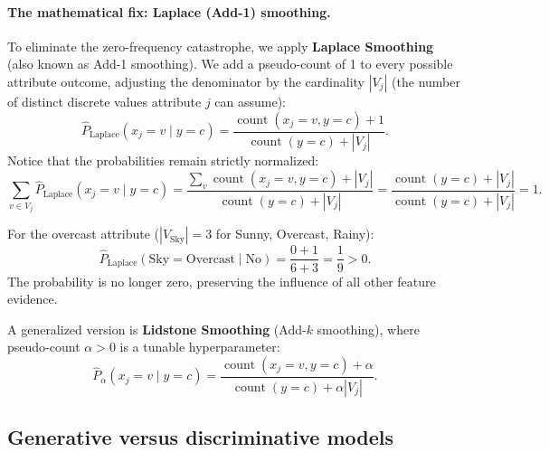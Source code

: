 \paragraph{The mathematical fix: Laplace (Add-1) smoothing.}
To eliminate the zero-frequency catastrophe, we apply \textbf{Laplace Smoothing} (also known as Add-1 smoothing). We add a pseudo-count of 1 to every possible attribute outcome, adjusting the denominator by the cardinality $|V_j|$ (the number of distinct discrete values attribute $j$ can assume):
\begin{equation}
\hat{P}_{\text{Laplace}}(x_j = v \mid y = c) = \frac{\operatorname{count}(x_j = v, y = c) + 1}{\operatorname{count}(y = c) + |V_j|}.
\label{eq:laplace_smoothing_formula}
\end{equation}
Notice that the probabilities remain strictly normalized:
\begin{equation}
\sum_{v \in V_j} \hat{P}_{\text{Laplace}}(x_j = v \mid y = c) = \frac{\sum_v \operatorname{count}(x_j = v, y = c) + |V_j|}{\operatorname{count}(y = c) + |V_j|} = \frac{\operatorname{count}(y = c) + |V_j|}{\operatorname{count}(y = c) + |V_j|} = 1.
\end{equation}

For the overcast attribute ($|V_{\text{Sky}}| = 3$ for Sunny, Overcast, Rainy):
\begin{equation}
\hat{P}_{\text{Laplace}}(\text{Sky}=\text{Overcast} \mid \text{No}) = \frac{0 + 1}{6 + 3} = \frac{1}{9} > 0.
\end{equation}
The probability is no longer zero, preserving the influence of all other feature evidence. 

A generalized version is \textbf{Lidstone Smoothing} (Add-$k$ smoothing), where pseudo-count $\alpha > 0$ is a tunable hyperparameter:
\begin{equation}
\hat{P}_{\alpha}(x_j = v \mid y = c) = \frac{\operatorname{count}(x_j = v, y = c) + \alpha}{\operatorname{count}(y = c) + \alpha |V_j|}.
\label{eq:lidstone_smoothing}
\end{equation}

\subsection{Generative versus discriminative models}
\label{sec:generative_vs_discriminative}

